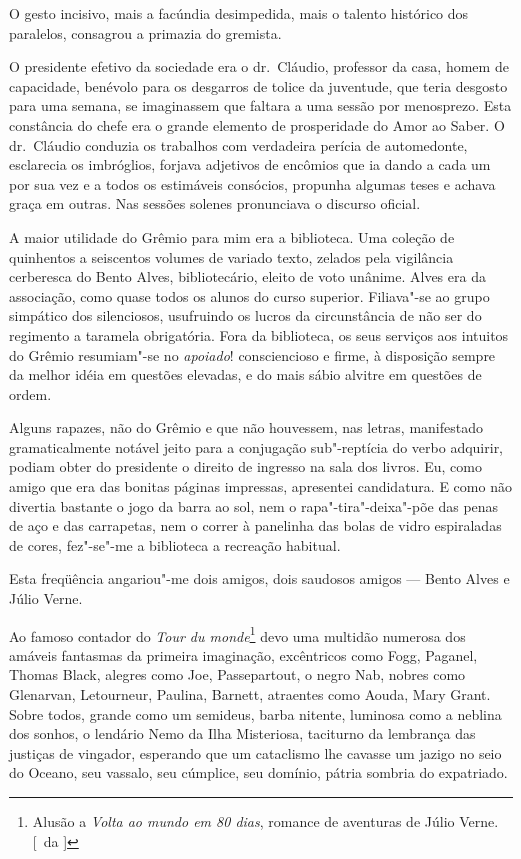 
O gesto incisivo,
mais a facúndia desimpedida, mais o talento histórico dos paralelos,
consagrou a primazia do gremista. 

O presidente efetivo da sociedade era
o dr.~Cláudio, professor da casa, homem de capacidade, benévolo para os
desgarros de tolice da juventude, que teria desgosto para uma semana,
se imaginassem que faltara a uma sessão por menosprezo. Esta constância
do chefe era o grande elemento de prosperidade do Amor ao Saber. 
O dr.~Cláudio conduzia os trabalhos com verdadeira perícia de automedonte,
esclarecia os imbróglios, forjava adjetivos de encômios que ia dando a
cada um por sua vez e a todos os estimáveis consócios, propunha algumas
teses e achava graça em outras. Nas sessões solenes pronunciava o
discurso oficial. 

A maior utilidade do Grêmio para mim era a
biblioteca. Uma coleção de quinhentos a seiscentos volumes de variado
texto, zelados pela vigilância cerberesca do Bento Alves,
bibliotecário, eleito de voto unânime. Alves era da associação, como
quase todos os alunos do curso superior. Filiava"-se ao grupo
simpático dos silenciosos, usufruindo os lucros da circunstância de não
ser do regimento a taramela obrigatória. Fora da biblioteca, os seus
serviços aos intuitos do Grêmio resumiam"-se no \textit{apoiado}! consciencioso
e firme, à disposição sempre da melhor idéia em questões elevadas, e do
mais sábio alvitre em questões de ordem. 

Alguns rapazes, não do Grêmio
e que não houvessem, nas letras, manifestado gramaticalmente notável
jeito para a conjugação sub"-reptícia do verbo adquirir, podiam obter
do presidente o direito de ingresso na sala dos livros. Eu, como amigo
que era das bonitas páginas impressas, apresentei candidatura. E como
não divertia bastante o jogo da barra ao sol, nem o
rapa"-tira"-deixa"-põe das penas de aço e das carrapetas, nem o
correr à panelinha das bolas de vidro espiraladas de cores, fez"-se"-me
a biblioteca a recreação habitual. 

Esta freqüência angariou"-me dois
amigos, dois saudosos amigos --- Bento Alves e Júlio Verne. 

Ao famoso contador do \textit{Tour du monde}\footnote{ Alusão a \textit{Volta ao mundo em 80 dias}, 
romance de aventuras de Júlio Verne. [~da ]} devo uma multidão numerosa dos amáveis
fantasmas da primeira imaginação, excêntricos como Fogg, Paganel,
Thomas Black, alegres como Joe, Passepartout, o negro Nab, nobres como
Glenarvan, Letourneur, Paulina, Barnett, atraentes como Aouda, Mary
Grant. Sobre todos, grande como um semideus, barba nitente, luminosa
como a neblina dos sonhos, o lendário Nemo da Ilha Misteriosa,
taciturno da lembrança das justiças de vingador, esperando que um
cataclismo lhe cavasse um jazigo no seio do Oceano, seu vassalo, seu
cúmplice, seu domínio, pátria sombria do expatriado.

